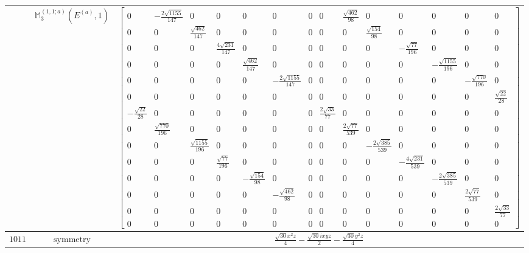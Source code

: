\documentclass[fleqn,8pt,landscape]{jsarticle}
\begin{document}
\begin{longtable}{ccc}
$  $ & $ \mathbb{M}_{3}^{(1,1;a)}(E^{(a)},1) $ & $ \begin{bmatrix} 0 & - \frac{2 \sqrt{1155}}{147} & 0 & 0 & 0 & 0 & 0 & 0 & \frac{\sqrt{462}}{98} & 0 & 0 & 0 & 0 & 0 \\ 0 & 0 & \frac{\sqrt{462}}{147} & 0 & 0 & 0 & 0 & 0 & 0 & \frac{\sqrt{154}}{98} & 0 & 0 & 0 & 0 \\ 0 & 0 & 0 & \frac{4 \sqrt{231}}{147} & 0 & 0 & 0 & 0 & 0 & 0 & - \frac{\sqrt{77}}{196} & 0 & 0 & 0 \\ 0 & 0 & 0 & 0 & \frac{\sqrt{462}}{147} & 0 & 0 & 0 & 0 & 0 & 0 & - \frac{\sqrt{1155}}{196} & 0 & 0 \\ 0 & 0 & 0 & 0 & 0 & - \frac{2 \sqrt{1155}}{147} & 0 & 0 & 0 & 0 & 0 & 0 & - \frac{\sqrt{770}}{196} & 0 \\ 0 & 0 & 0 & 0 & 0 & 0 & 0 & 0 & 0 & 0 & 0 & 0 & 0 & \frac{\sqrt{22}}{28} \\ - \frac{\sqrt{22}}{28} & 0 & 0 & 0 & 0 & 0 & 0 & \frac{2 \sqrt{33}}{77} & 0 & 0 & 0 & 0 & 0 & 0 \\ 0 & \frac{\sqrt{770}}{196} & 0 & 0 & 0 & 0 & 0 & 0 & \frac{2 \sqrt{77}}{539} & 0 & 0 & 0 & 0 & 0 \\ 0 & 0 & \frac{\sqrt{1155}}{196} & 0 & 0 & 0 & 0 & 0 & 0 & - \frac{2 \sqrt{385}}{539} & 0 & 0 & 0 & 0 \\ 0 & 0 & 0 & \frac{\sqrt{77}}{196} & 0 & 0 & 0 & 0 & 0 & 0 & - \frac{4 \sqrt{231}}{539} & 0 & 0 & 0 \\ 0 & 0 & 0 & 0 & - \frac{\sqrt{154}}{98} & 0 & 0 & 0 & 0 & 0 & 0 & - \frac{2 \sqrt{385}}{539} & 0 & 0 \\ 0 & 0 & 0 & 0 & 0 & - \frac{\sqrt{462}}{98} & 0 & 0 & 0 & 0 & 0 & 0 & \frac{2 \sqrt{77}}{539} & 0 \\ 0 & 0 & 0 & 0 & 0 & 0 & 0 & 0 & 0 & 0 & 0 & 0 & 0 & \frac{2 \sqrt{33}}{77} \\ 0 & 0 & 0 & 0 & 0 & 0 & 0 & 0 & 0 & 0 & 0 & 0 & 0 & 0 \end{bmatrix} $ \\ \hline
$ 1011 $ & $ \text{symmetry} $ & $ \frac{\sqrt{30} x^{2} z}{4} - \frac{\sqrt{30} i x y z}{2} - \frac{\sqrt{30} y^{2} z}{4} $ \\

\end{longtable}
\end{document}
